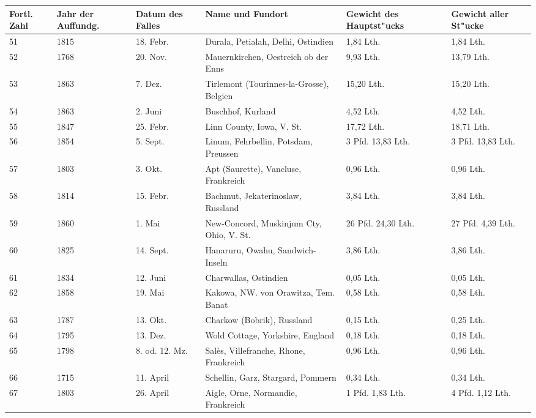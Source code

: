 \documentclass[a4paper, 11pt, oneside, german]{article}
\begin{document}
\begin{center}
\begin{footnotesize}
\begin{tabular}{ |p{7mm}|p{7mm}|p{13mm}|p{48mm}|p{22mm}|p{22mm}| }
    \hline
    Fortl. Zahl & Jahr der Auffundg. & Datum des Falles & Name und Fundort & Gewicht des Hauptst"ucks & Gewicht aller St"ucke\\
    \hline\hline
    51 & 1815 & 18. Febr. & Durala, Petialah, Delhi, Ostindien & 1,84 Lth. & 1,84 Lth.\\\hline
    52 & 1768 & 20. Nov. & Mauernkirchen, Oestreich ob der Enns & 9,93 Lth. & 13,79 Lth.\\\hline
    53 & 1863 & 7. Dez. & Tirlemont (Tourinnes-la-Grosse), Belgien & 15,20 Lth. & 15,20 Lth.\\\hline
    54 & 1863 & 2. Juni & Buschhof, Kurland & 4,52 Lth. & 4,52 Lth.\\\hline
    55 & 1847 & 25. Febr. & Linn County, Iowa, V. St. & 17,72 Lth. & 18,71 Lth.\\\hline
    56 & 1854 & 5. Sept. & Linum, Fehrbellin, Potsdam, Preussen & 3 Pfd. 13,83 Lth. & 3 Pfd. 13,83 Lth.\\\hline
    57 & 1803 & 3. Okt. & Apt (Saurette), Vancluse, Frankreich & 0,96 Lth. & 0,96 Lth.\\\hline
    58 & 1814 & 15. Febr. & Bachmut, Jekaterinoslaw, Russland & 3,84 Lth. & 3,84 Lth.\\\hline
    59 & 1860 & 1. Mai & New-Concord, Muskinjum Cty, Ohio, V. St. & 26 Pfd. 24,30 Lth. & 27 Pfd. 4,39 Lth.\\\hline
    60 & 1825 & 14. Sept. & Hanaruru, Owahu, Sandwich-Inseln & 3,86 Lth. & 3,86 Lth.\\\hline
    61 & 1834 & 12. Juni & Charwallas, Ostindien & 0,05 Lth. & 0,05 Lth.\\\hline
    62 & 1858 & 19. Mai & Kakowa, NW. von Orawitza, Tem. Banat & 0,58 Lth. & 0,58 Lth.\\\hline
    63 & 1787 & 13. Okt. & Charkow (Bobrik), Russland & 0,15 Lth. & 0,25 Lth.\\\hline
    64 & 1795 & 13. Dez. & Wold Cottage, Yorkshire, England & 0,18 Lth. & 0,18 Lth.\\\hline
    65 & 1798 & 8. od. 12. Mz. & Salès, Villefranche, Rhone, Frankreich & 0,96 Lth. & 0,96 Lth.\\\hline
    66 & 1715 & 11. April & Schellin, Garz, Stargard, Pommern & 0,34 Lth. & 0,34 Lth.\\\hline
    67 & 1803 & 26. April & Aigle, Orne, Normandie, Frankreich & 1 Pfd. 1,83 Lth. & 4 Pfd. 1,12 Lth.\\\hline

\end{tabular}
\end{footnotesize}
\end{center}
\end{document}
